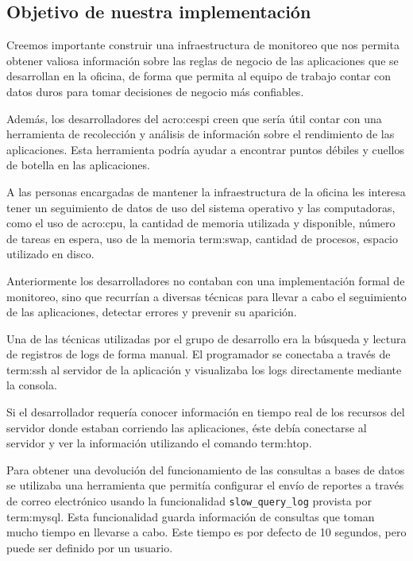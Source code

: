\subsection{Objetivo de nuestra implementación}
\label{objetivos_de_nuestra_implementacion}

Creemos importante construir una infraestructura de monitoreo que nos permita
obtener valiosa información sobre las reglas de negocio de las aplicaciones que
se desarrollan en la oficina, de forma que permita al equipo de trabajo contar
con datos duros para tomar decisiones de negocio más confiables.

Además, los desarrolladores del \gls{acro:cespi} creen que sería útil contar con
una herramienta de recolección y análisis de información sobre el rendimiento de
las aplicaciones. Esta herramienta podría ayudar a encontrar puntos débiles y
cuellos de botella en las aplicaciones.

A las personas encargadas de mantener la infraestructura de la oficina les
interesa tener un seguimiento de datos de uso del sistema operativo y las
computadoras, como el uso de \gls{acro:cpu}, la cantidad de memoria utilizada y
disponible, número de tareas en espera, uso de la memoria \gls{term:swap},
cantidad de procesos, espacio utilizado en disco.

Anteriormente los desarrolladores no contaban con una implementación formal de
monitoreo, sino que recurrían a diversas técnicas para llevar a cabo el
seguimiento de las aplicaciones, detectar errores y prevenir su aparición.

Una de las técnicas utilizadas por el grupo de desarrollo era la búsqueda y
lectura de registros de logs de forma manual. El programador se conectaba a
través de \gls{term:ssh} al servidor de la aplicación y visualizaba los logs
directamente mediante la consola.

Si el desarrollador requería conocer información en tiempo real de los recursos
del servidor donde estaban corriendo las aplicaciones, éste debía conectarse al
servidor y ver la información utilizando el comando \gls{term:htop}.

Para obtener una devolución del funcionamiento de las consultas a bases de
datos se utilizaba una herramienta que permitía configurar el envío de reportes
a través de correo electrónico usando la funcionalidad
\texttt{slow\_query\_log} provista por \gls{term:mysql}. Esta funcionalidad
guarda información de consultas que toman mucho tiempo en llevarse a cabo. Este
tiempo es por defecto de 10 segundos, pero puede ser definido por un usuario.

